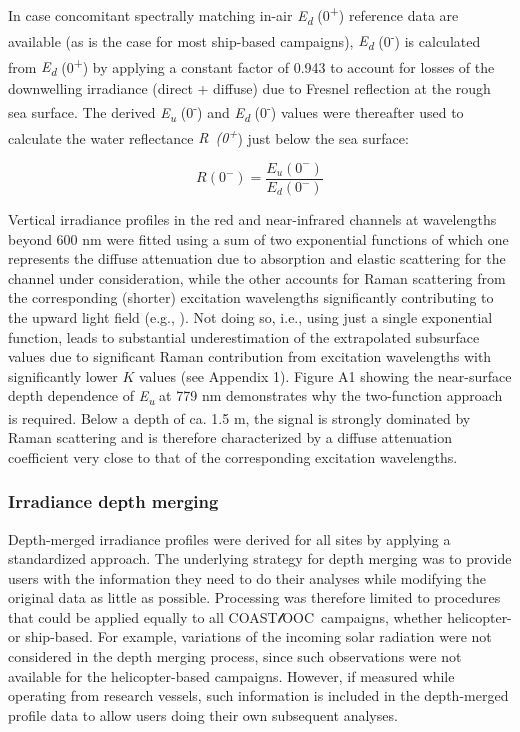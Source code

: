 \documentclass[essd, manuscript]{copernicus}
\newcommand{\coastlooc}{COAST$\mathscr{l}$OOC~\allowbreak}
\begin{document}
In case concomitant spectrally matching in-air \textit{E\textsubscript{d}} (0\textsuperscript{+}) reference data are available (as is the case for most ship-based campaigns), \textit{E\textsubscript{d}} (0\textsuperscript{-}) is calculated from \textit{E\textsubscript{d}} (0\textsuperscript{+}) by applying a constant factor of 0.943 to account for losses of the downwelling irradiance (direct + diffuse) due to Fresnel reflection at the rough sea surface. The derived \textit{E\textsubscript{u}} (0\textsuperscript{-}) and \textit{E\textsubscript{d}} (0\textsuperscript{-}) values were thereafter used to calculate the water reflectance \textit{R~(0\textsuperscript{+}}) just below the sea surface:

\begin{equation}
    R(0^-) = \frac{E_u(0^-)}{E_d(0^-)}
\end{equation}

Vertical irradiance profiles in the red and near-infrared channels at wavelengths beyond 600 nm were fitted using a sum of two exponential functions of which one represents the diffuse attenuation due to absorption and elastic scattering for the channel under consideration, while the other accounts for Raman scattering from the corresponding (shorter) excitation wavelengths significantly contributing to the upward light field (e.g., \citealt{Sugihara1984}). Not doing so, i.e., using just a single exponential function, leads to substantial underestimation of the extrapolated subsurface values due to significant Raman contribution from excitation wavelengths with significantly lower $K$ values (see Appendix 1). Figure A1 showing the near-surface depth dependence of \textit{E\textsubscript{u}} at 779 nm demonstrates why the two-function approach is required. Below a depth of ca. 1.5 m, the signal is strongly dominated by Raman scattering and is therefore characterized by a diffuse attenuation coefficient very close to that of the corresponding excitation wavelengths.

\subsubsection{Irradiance depth merging}

Depth-merged irradiance profiles were derived for all sites by applying a standardized approach. The underlying strategy for depth merging was to provide users with the information they need to do their analyses while modifying the original data as little as possible. Processing was therefore limited to procedures that could be applied equally to all \coastlooc campaigns, whether helicopter- or ship-based. For example, variations of the incoming solar radiation were not considered in the depth merging process, since such observations were not available for the helicopter-based campaigns. However, if measured while operating from research vessels, such information is included in the depth-merged profile data to allow users doing their own subsequent analyses.
\end{document}
